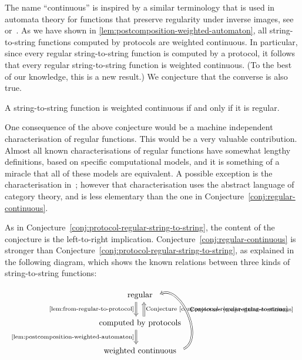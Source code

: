 The name ``continuous'' is inspired by a similar terminology that is used in automata theory for functions that preserve regularity under inverse images, see~\cite[Theorem 4.1]{PinSilva05} or~\cite[Footnote 2]{continuity20}. 
As we have shown in \cref{lem:postcomposition-weighted-automaton}, all string-to-string functions computed by protocols are weighted continuous. In particular, since every regular string-to-string function is computed by a protocol, it follows that every regular string-to-string function is weighted continuous. (To the best of our knowledge, this is a new result.)
We conjecture that the converse is also true.

\begin{conjecture}\label{conj:regular-continuous}
    A string-to-string function is weighted continuous if and only if it is regular.
\end{conjecture}

 One consequence of the above conjecture would be a machine independent characterisation of regular functions. This would be a very valuable contribution. Almost all known characterisations of regular functions have somewhat lengthy definitions, based on specific computational models, and it is something of a  miracle that all of these models are equivalent. A possible exception is the characterisation in~\cite{bojanczykTitoRegular23}; however that characterisation uses the abstract language of category theory, and is less elementary than the one in Conjecture~\ref{conj:regular-continuous}.

As in Conjecture~\ref{conj:protocol-regular-string-to-string}, the content of the conjecture is the left-to-right implication. 
Conjecture~\ref{conj:regular-continuous} is stronger than Conjecture~\ref{conj:protocol-regular-string-to-string}, as explained in the following diagram, which shows the known relations between three kinds of string-to-string functions:
\[
\begin{tikzcd}
\text{regular}
\ar[d,Rightarrow,shift right=2, "\text{\cref{lem:from-regular-to-protocol}}"']
\\
\text{computed by protocols}
\ar[d,Rightarrow, shift right=2, "\text{\cref{lem:postcomposition-weighted-automaton}}"']
\ar[u,Rightarrow, shift right=2,"\text{Conjecture~\ref{conj:protocol-regular-string-to-string}}"']
\\ 
\text{weighted continuous} 
\ar[uu,bend right=89, Rightarrow, shift right=2,"\text{Conjecture~\ref{conj:regular-continuous}}"']
\end{tikzcd}
\]


